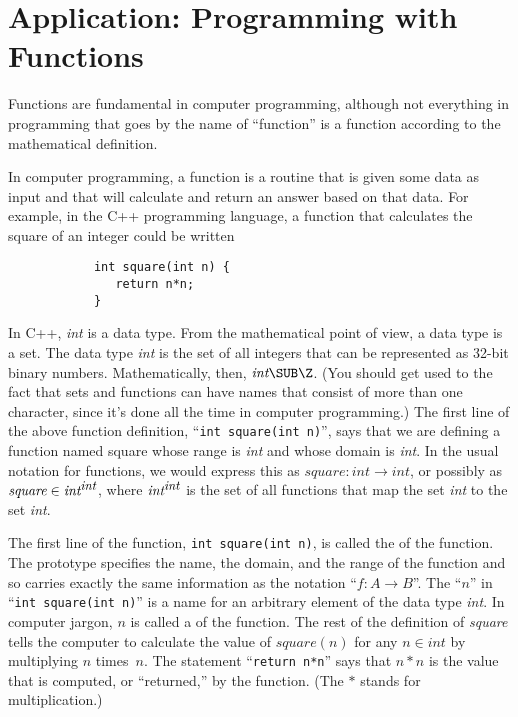 \section{Application: Programming with Functions}\label{S-sets-5}

Functions are fundamental in computer programming,
although not everything in programming that goes by the name of ``function''
is a function according to the mathematical definition.

In computer programming, a function is a routine that is given 
some data as input and that will calculate and return an
answer based on that data.  For example, in the C++ programming
language, a function that calculates the square of an integer
could be written
\begin{verbatim}
            int square(int n) {
               return n*n;
            }
\end{verbatim}
In C++, \textit{int} is a data type.  From the mathematical
point of view, a data type is a set.  The data type \textit{int}
is the set of all integers that can be represented as 32-bit 
binary numbers.  Mathematically, then, $\textit{int}\SUB\Z$.
(You should get used to the fact that sets and functions can
have names that consist of more than one character, since
it's done all the time in computer programming.)
The first line of the above function definition,
``\verb=int square(int n)='', says that we are defining
a function named square whose range is \textit{int}
and whose domain is \textit{int}.  In the usual notation for
functions, we would express this as $\textit{square}\colon \textit{int}\to\textit{int}$,
or possibly as $\textit{square}\in{\textit{int}}^{\textit{\small{int}}}$,
where ${\textit{int}}^{\textit{\small{int}}}$ is the set of all
functions that map the set \textit{int} to the set \textit{int}.

The first line of the function, \verb=int square(int n)=, is called
the  of the function.  The prototype specifies the
name, the domain, and the range of the function and so carries
exactly the same information as the notation ``$f\colon A\to B$''.
The ``$n$'' in ``\verb=int square(int n)='' is a name for
an arbitrary element of the data type \textit{int}.  In computer
jargon, $n$ is called a  of the function.
The rest of the definition of \textit{square} tells the computer
to calculate the value of $\textit{square}(n)$ for any $n\in\textit{int}$
by multiplying $n$ times~$n$.  The statement ``\verb=return n*n=''
says that $n*n$ is the value that is computed, or ``returned,''
by the function.  (The $*$ stands for multiplication.)

